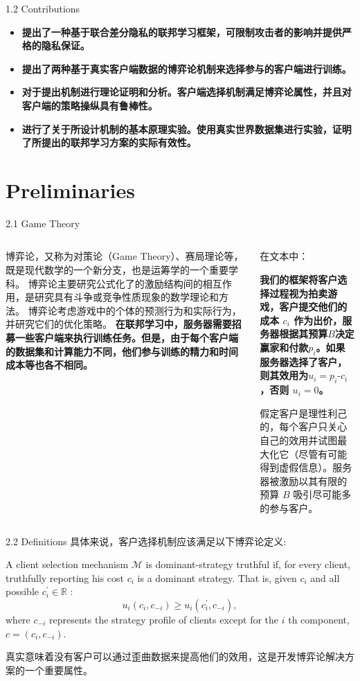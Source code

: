 \documentclass{sintefbeamer}
\theoremstyle{definition}
\begin{document}
\begin{frame}{1.2 Contributions}{\empty}
\begin{itemize}
\item \textbf{提出了一种基于联合差分隐私的联邦学习框架，可限制攻击者的影响并提供严格的隐私保证。}
\item \textbf{提出了两种基于真实客户端数据的博弈论机制来选择参与的客户端进行训练。}
\item \textbf{对于提出机制进行理论证明和分析。客户端选择机制满足博弈论属性，并且对客户端的策略操纵具有鲁棒性。}
\item \textbf{进行了关于所设计机制的基本原理实验。使用真实世界数据集进行实验，证明了所提出的联邦学习方案的实际有效性。}
\end{itemize}
\end{frame}

\section{Preliminaries}

\begin{frame}{2.1 Game Theory}{\empty}
\begin{columns}
\begin{column}{0.5\textwidth}
博弈论，又称为对策论（Game Theory）、赛局理论等，既是现代数学的一个新分支，也是运筹学的一个重要学科。 博弈论主要研究公式化了的激励结构间的相互作用，是研究具有斗争或竞争性质现象的数学理论和方法。 博弈论考虑游戏中的个体的预测行为和实际行为，并研究它们的优化策略。
\textbf{在联邦学习中，服务器需要招募一些客户端来执行训练任务。但是，由于每个客户端的数据集和计算能力不同，他们参与训练的精力和时间成本等也各不相同。}
\end{column}
\begin{column}{0.5\textwidth}
在文本中：

\textbf{我们的框架将客户选择过程视为拍卖游戏，客户提交他们的成本 $c_i$ 作为出价，服务器根据其预算$B$决定赢家和付款$p_i$。如果服务器选择了客户，则其效用为$u_i = p_i \text{-} c_i$，否则 $u_i = 0$。}

假定客户是理性利己的，每个客户只关心自己的效用并试图最大化它（尽管有可能得到虚假信息）。服务器被激励以其有限的预算 $B$ 吸引尽可能多的参与客户。
\end{column}
\end{columns}
\end{frame}

\begin{frame}{2.2 Definitions}{\empty}
具体来说，客户选择机制应该满足以下博弈论定义:
\begin{definition}
 A client selection mechanism $\mathcal{M}$ is dominant-strategy truthful if, for every client, truthfully reporting his cost $c_i$ is a dominant strategy. That is, given $c_i$ and all possible $c_i^{\prime} \in \mathbb{R}$ :
$$
u_i\left(c_i, c_{-i}\right) \geq u_i\left(c_i^{\prime}, c_{-i}\right),
$$
where $c_{-i}$ represents the strategy profile of clients except for the $i$ th component, $c=\left(c_i, c_{-i}\right)$.
\end{definition}
真实意味着没有客户可以通过歪曲数据来提高他们的效用，这是开发博弈论解决方案的一个重要属性。
\end{frame}
\end{document}

